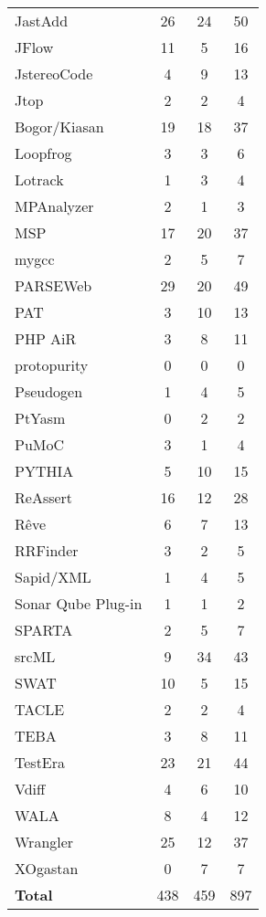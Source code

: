 \begin{longtable}{ l c c c }
   JastAdd & 26 & 24 & 50 \\
   JFlow & 11 & 5 & 16 \\
   JstereoCode & 4 & 9 & 13 \\
   Jtop & 2 & 2 & 4 \\
   Bogor/Kiasan & 19 & 18 & 37 \\
   Loopfrog & 3 & 3 & 6 \\
   Lotrack & 1 & 3 & 4 \\
   MPAnalyzer & 2 & 1 & 3 \\
   MSP & 17 & 20 & 37 \\
   mygcc & 2 & 5 & 7 \\
   PARSEWeb & 29 & 20 & 49 \\
   PAT & 3 & 10 & 13 \\
   PHP AiR & 3 & 8 & 11 \\
   protopurity & 0 & 0 & 0 \\
   Pseudogen & 1 & 4 & 5 \\
   PtYasm & 0 & 2 & 2 \\
   PuMoC & 3 & 1 & 4 \\
   PYTHIA & 5 & 10 & 15 \\
   ReAssert & 16 & 12 & 28 \\
   Rêve & 6 & 7 & 13 \\
   RRFinder & 3 & 2 & 5 \\
   Sapid/XML & 1 & 4 & 5 \\
   Sonar Qube Plug-in & 1 & 1 & 2 \\
   SPARTA & 2 & 5 & 7 \\
   srcML & 9 & 34 & 43 \\
   SWAT & 10 & 5 & 15 \\
   TACLE & 2 & 2 & 4 \\
   TEBA & 3 & 8 & 11 \\
   TestEra & 23 & 21 & 44 \\
   Vdiff & 4 & 6 & 10 \\
   WALA & 8 & 4 & 12 \\
   Wrangler & 25 & 12 & 37 \\
   XOgastan & 0 & 7 & 7 \\
  \hline
  {\bf Total} & 438 & 459 & 897 \\
\end{longtable}

